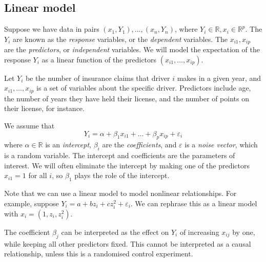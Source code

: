 \subsection{Linear model}
Suppose we have data in pairs \( (x_1, Y_1), \dots, (x_n, Y_n) \), where \( Y_i \in \mathbb R, x_i \in \mathbb R^p \).
The \( Y_i \) are known as the \textit{response} variables, or the \textit{dependent} variables.
The \( x_{i1}, x_{ip} \) are the \textit{predictors}, or \textit{independent} variables.
We will model the expectation of the response \( Y_i \) as a linear function of the predictors \( (x_{i1}, \dots, x_{ip}) \).
\begin{example}
	Let \( Y_i \) be the number of insurance claims that driver \( i \) makes in a given year, and \( x_{i1}, \dots, x_{ip} \) is a set of variables about the specific driver.
	Predictors include age, the number of years they have held their license, and the number of points on their license, for instance.
\end{example}
We assume that
\[
	Y_i = \alpha + \beta_1 x_{i1} + \dots + \beta_p x_{ip} + \varepsilon_i
\]
where \( \alpha \in \mathbb R \) is an \textit{intercept}, \( \beta_i \) are the \textit{coefficients}, and \( \varepsilon \) is a \textit{noise vector}, which is a random variable.
The intercept and coefficients are the parameters of interest.
We will often eliminate the intercept by making one of the predictors \( x_{i1} = 1 \) for all \( i \), so \( \beta_1 \) plays the role of the intercept.

Note that we can use a linear model to model nonlinear relationships.
For example, suppose \( Y_i = a + bz_i + cz_i^2 + \varepsilon_i \).
We can rephrase this as a linear model with \( x_i = (1, z_i, z_i^2) \).

The coefficient \( \beta_j \) can be interpreted as the effect on \( Y_i \) of increasing \( x_{ij} \) by one, while keeping all other predictors fixed.
This cannot be interpreted as a causal relationship, unless this is a randomised control experiment.

